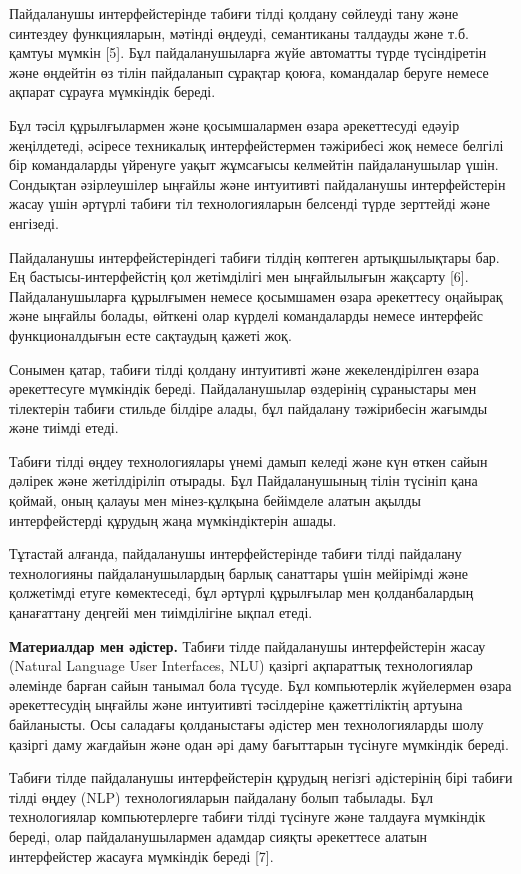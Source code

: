 Пайдаланушы интерфейстерінде табиғи тілді қолдану сөйлеуді тану және
синтездеу функцияларын, мәтінді өңдеуді, семантиканы талдауды және т.б.
қамтуы мүмкін {[}5{]}. Бұл пайдаланушыларға жүйе автоматты түрде
түсіндіретін және өңдейтін өз тілін пайдаланып сұрақтар қоюға,
командалар беруге немесе ақпарат сұрауға мүмкіндік береді.

Бұл тәсіл құрылғылармен және қосымшалармен өзара әрекеттесуді едәуір
жеңілдетеді, әсіресе техникалық интерфейстермен тәжірибесі жоқ немесе
белгілі бір командаларды үйренуге уақыт жұмсағысы келмейтін
пайдаланушылар үшін. Сондықтан әзірлеушілер ыңғайлы және интуитивті
пайдаланушы интерфейстерін жасау үшін әртүрлі табиғи тіл технологияларын
белсенді түрде зерттейді және енгізеді.

Пайдаланушы интерфейстеріндегі табиғи тілдің көптеген артықшылықтары
бар. Ең бастысы-интерфейстің қол жетімділігі мен ыңғайлылығын жақсарту
{[}6{]}. Пайдаланушыларға құрылғымен немесе қосымшамен өзара әрекеттесу
оңайырақ және ыңғайлы болады, өйткені олар күрделі командаларды немесе
интерфейс функционалдығын есте сақтаудың қажеті жоқ.

Сонымен қатар, табиғи тілді қолдану интуитивті және жекелендірілген
өзара әрекеттесуге мүмкіндік береді. Пайдаланушылар өздерінің
сұраныстары мен тілектерін табиғи стильде білдіре алады, бұл пайдалану
тәжірибесін жағымды және тиімді етеді.

Табиғи тілді өңдеу технологиялары үнемі дамып келеді және күн өткен
сайын дәлірек және жетілдіріліп отырады. Бұл Пайдаланушының тілін
түсініп қана қоймай, оның қалауы мен мінез-құлқына бейімделе алатын
ақылды интерфейстерді құрудың жаңа мүмкіндіктерін ашады.

Тұтастай алғанда, пайдаланушы интерфейстерінде табиғи тілді пайдалану
технологияны пайдаланушылардың барлық санаттары үшін мейірімді және
қолжетімді етуге көмектеседі, бұл әртүрлі құрылғылар мен қолданбалардың
қанағаттану деңгейі мен тиімділігіне ықпал етеді.

{\bfseries Материалдар мен әдістер.} Табиғи тілде пайдаланушы
интерфейстерін жасау (Natural Language User Interfaces, NLU) қазіргі
ақпараттық технологиялар әлемінде барған сайын танымал бола түсуде. Бұл
компьютерлік жүйелермен өзара әрекеттесудің ыңғайлы және интуитивті
тәсілдеріне қажеттіліктің артуына байланысты. Осы саладағы қолданыстағы
әдістер мен технологияларды шолу қазіргі даму жағдайын және одан әрі
даму бағыттарын түсінуге мүмкіндік береді.

Табиғи тілде пайдаланушы интерфейстерін құрудың негізгі әдістерінің бірі
табиғи тілді өңдеу (NLP) технологияларын пайдалану болып табылады. Бұл
технологиялар компьютерлерге табиғи тілді түсінуге және талдауға
мүмкіндік береді, олар пайдаланушылармен адамдар сияқты әрекеттесе
алатын интерфейстер жасауға мүмкіндік береді {[}7{]}.

